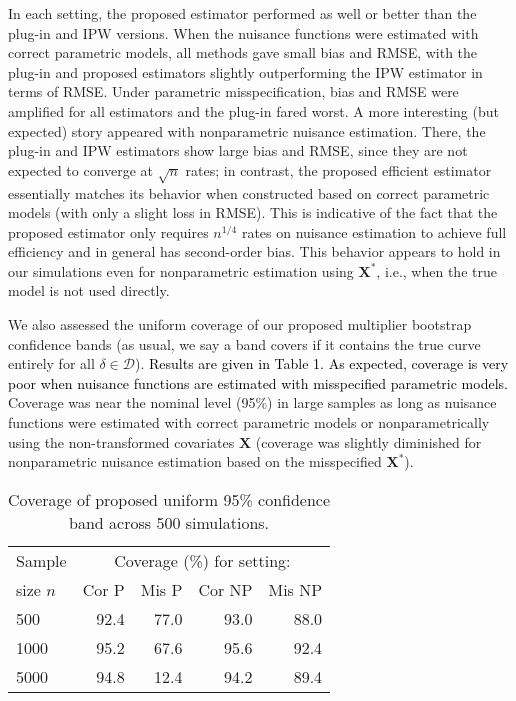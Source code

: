 \documentclass[12pt]{article}
\newcommand{\bX}{\mathbf{X}}
\theoremstyle{remark}
\begin{document}
In each setting, the proposed estimator performed as well or better than the plug-in and IPW versions. When the nuisance functions were estimated with correct parametric models, all methods gave small bias and RMSE, with the plug-in and proposed estimators slightly outperforming the IPW estimator in terms of RMSE. Under parametric misspecification, bias and RMSE were amplified for all estimators and the plug-in fared worst. A more interesting (but expected) story appeared with nonparametric nuisance estimation. There, the plug-in and IPW estimators show large bias and RMSE, since they are not expected to converge at $\sqrt{n}$ rates; in contrast, the proposed efficient estimator essentially matches its behavior when constructed based on correct parametric models (with only a slight loss in RMSE). This is indicative of the fact that the proposed estimator only requires $n^{1/4}$ rates on nuisance estimation to achieve full efficiency and in general has second-order bias. This behavior appears to hold in our simulations even for nonparametric estimation using $\bX^*$, i.e., when the true model is not used directly.

We also assessed the uniform coverage of our proposed multiplier bootstrap confidence bands (as usual, we say a band covers if it contains the true curve entirely for all $\delta \in \mathcal{D}$). \textcolor{black}{Results are given in Table 1. As expected, coverage is very poor when nuisance functions are estimated with misspecified parametric models.} Coverage was near the nominal level (95\%) in large samples as long as nuisance functions were estimated with correct parametric models or nonparametrically using the non-transformed covariates $\bX$ (coverage was slightly diminished  for nonparametric nuisance estimation based on the misspecified $\bX^*$). 

\begin{table}[h!]
\caption{Coverage of proposed uniform 95\% confidence band across 500 simulations. \label{tab:simtab2}}
\begin{center}
\begin{tabular}{lrrrr}
\hline
Sample & \multicolumn{4}{c}{Coverage (\%) for setting:} \\
size $n$ & Cor P & Mis P & Cor NP & Mis NP  \\
\hline
500 & 92.4 & 77.0 & 93.0 & 88.0 \\
1000 & 95.2 & 67.6 & 95.6 & 92.4 \\
5000 & 94.8 & 12.4 & 94.2 & 89.4 \\
\hline
\end{tabular} 
\end{center}
\end{table}
\end{document}
